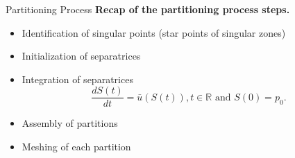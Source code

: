 \documentclass[compress,10pt,aspectratio=169]{beamer}
\begin{document}
\begin{frame}{Partitioning Process}%
\small
{\bf Recap of the partitioning process steps.}\\\vspace{0.5cm}
\begin{itemize}
    \item Identification of singular points (star points of singular zones)\\\vspace{0.3cm}
    \item Initialization of separatrices\\\vspace{0.3cm}
    \item Integration of separatrices\vspace{0.3cm}
\begin{equation*}
\frac{dS(t)}{dt}=\bar{u}(S(t)),t\in \mathbb{R} \text{ and } S(0)=p_0.
\end{equation*}
\item Assembly of partitions\vspace{0.3cm}
\item Meshing of each partition\vspace{0.3cm}
\end{itemize}
\end{frame}
\end{document}
